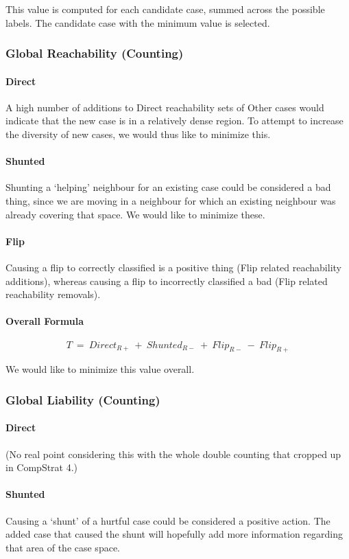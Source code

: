 \documentclass[a4paper,11pt]{report}
\begin{document}
This value is computed for each candidate case, summed across the possible labels. The candidate case with the minimum value is selected.

\subsubsection{Global Reachability (Counting)}
\paragraph{Direct}
A high number of additions to Direct reachability sets of Other cases would indicate that the new case is in a relatively dense region. To attempt to increase the diversity of new cases, we would thus like to minimize this.

\paragraph{Shunted}
Shunting a `helping' neighbour for an existing case could be considered a bad thing, since we are moving in a neighbour for which an existing neighbour was already covering that space. We would like to minimize these.

\paragraph{Flip}
Causing a flip to correctly classified is a positive thing (Flip related reachability additions), whereas causing a flip to incorrectly classified a bad (Flip related reachability removals).

\paragraph{Overall Formula}
\[  
  T~=~Direct_{R+}~+~Shunted_{R-}~+~Flip_{R-}~-~Flip_{R+}
\]

We would like to minimize this value overall.

\subsubsection{Global Liability (Counting)}
\paragraph{Direct}
(No real point considering this with the whole double counting that cropped up in CompStrat 4.)

\paragraph{Shunted}
Causing a `shunt' of a hurtful case could be considered a positive action. The added case that caused the shunt will hopefully add more information regarding that area of the case space. 
\end{document}

